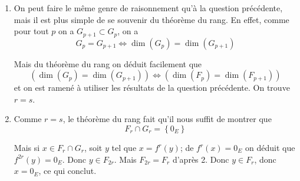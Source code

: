\begin{enumerate}
%
%
\item On peut faire le même genre de raisonnement qu'à la question précédente, mais il est plus simple de se souvenir du théorème du rang. En effet, comme pour tout $p$ on a $G_{p+1} \subset G_p$, on a
$$
G_p=G_{p+1} \Longleftrightarrow \operatorname{dim}\left(G_p\right)=\operatorname{dim}\left(G_{p+1}\right)
$$

Mais du théorème du rang on déduit facilement que
$$
\left(\operatorname{dim}\left(G_p\right)=\operatorname{dim}\left(G_{p+1}\right)\right) \Longleftrightarrow\left(\operatorname{dim}\left(F_p\right)=\operatorname{dim}\left(F_{p+1}\right)\right)
$$
et on est ramené à utiliser les résultats de la question précédente. On trouve $r=s$.
\item Comme $r=s$, le théorème du rang fait qu'il nous suffit de montrer que
$$
F_r \cap G_r=\left\{0_E\right\}
$$

Mais si $x \in F_r \cap G_r$, soit $y$ tel que $x=f^r(y)$; de $f^r(x)=0_E$ on déduit que $f^{2 r}(y)=0_E$. Donc $y \in F_{2 r}$. Mais $F_{2 r}=F_r$ d'après 2. Donc $y \in F_r$, donc $x=0_E$, ce qui conclut.
\end{enumerate}
